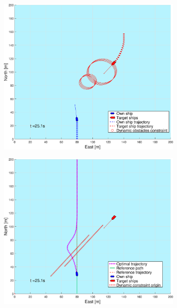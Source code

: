 \begin{figure}[ht!] %
    \begin{subfigure}[b]{0.494\textwidth}
        \centering
        \includegraphics[width=\textwidth]{Images/Figures/sving_GW/_Simple_1fig1_time=25}
        \subcaption{}
    \end{subfigure}
    \hfill
    \begin{subfigure}[b]{0.494\textwidth}
        \centering
        \includegraphics[width=\textwidth]{Images/Figures/sving_GW/_Simple_1fig999_time=25}

\end{subfigure}
\end{figure}
